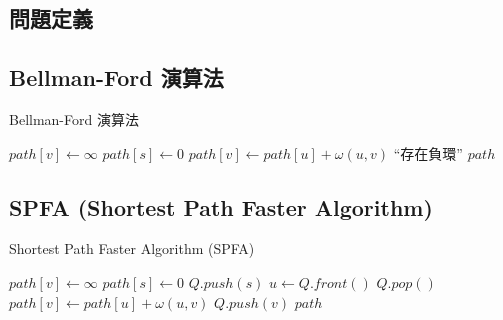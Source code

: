 \subsection{問題定義}
\subsection{Bellman-Ford 演算法}

\begin{algorithm}
\label{algo-bellman-ford}
\caption{Bellman-Ford 演算法}
\begin{algorithmic}[1]
  \State{}
    \State $path[v]\gets\infty$
  \EndFor
  \State $path[s]\gets{0}$
        \State $path[v]\gets{path[u]+\omega{(u,v)}}$
      \EndIf
    \EndFor
  \EndFor
      \State \Return ``存在負環''
    \EndIf
  \EndFor
  \State \Return $path$
\EndProcedure
\end{algorithmic}
\end{algorithm}

\subsection{SPFA (Shortest Path Faster Algorithm)}

\begin{algorithm}
\label{algo-spfa}
\caption{Shortest Path Faster Algorithm (SPFA)}
\begin{algorithmic}[1]
  \State{}
    \State $path[v]\gets\infty$
  \EndFor
  \State $path[s]\gets{0}$
  \State $Q.push(s)$
    \State $u\gets{Q.front()}$
    \State $Q.pop()$
        \State $path[v]\gets{path[u]+\omega{(u,v)}}$
          \State $Q.push(v)$
        \EndIf
      \EndIf
    \EndFor
  \EndWhile
  \State \Return $path$
\EndProcedure
\end{algorithmic}
\end{algorithm}

